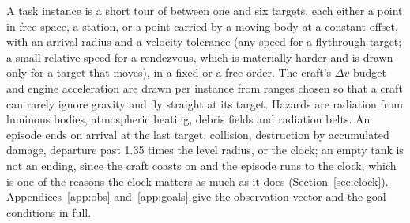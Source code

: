 \documentclass[11pt]{article}
\begin{document}
A task instance is a short tour of between one and six targets, each either
a point in free space, a station, or a point carried by a moving body at a
constant offset, with an arrival radius and a velocity tolerance (any speed
for a flythrough target; a small relative speed for a rendezvous, which is
materially harder and is drawn only for a target that moves), in a fixed or
a free order. The craft's $\Delta v$ budget and engine acceleration are drawn
per instance from ranges chosen so that a craft can rarely ignore gravity
and fly straight at its target. Hazards are radiation from luminous bodies,
atmospheric heating, debris fields and radiation belts. An episode ends on
arrival at the last target, collision, destruction by accumulated damage,
departure past 1.35 times the level radius, or the clock; an empty tank is
not an ending, since the craft coasts on and the episode runs to the clock,
which is one of the reasons the clock matters as much as it does
(Section~\ref{sec:clock}). Appendices~\ref{app:obs} and~\ref{app:goals}
give the observation vector and the goal conditions in full.


\end{document}
